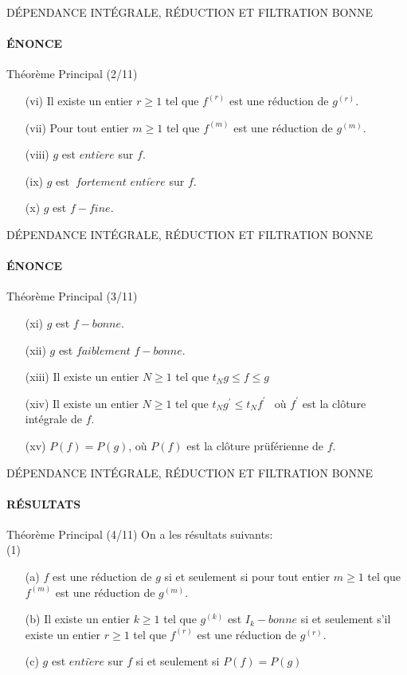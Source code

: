 \documentclass[11pt,a4paper]{beamer}
\begin{document}
\begin{frame}{DÉPENDANCE INTÉGRALE, RÉDUCTION ET FILTRATION BONNE}
	\framesubtitle{ÉNONCE}
	\begin{block}{Théorème Principal (2/11)}
		\begin{enumerate}
	\item[(vi)] Il existe un entier $r\geq 1$ tel que $f^{(r)}$ est une réduction de $g^{(r)}.$
			\item[(vii)] Pour tout entier $m\geq 1$ tel que $f^{(m)}$ est une réduction de $g^{(m)}.$
			\item[(viii)] $g$ est $enti\grave{e}re$ sur $f.$
			\item[(ix)] $g$ est $\ fortement$ $enti\grave{e}re$ sur $f.$
			\item[(x)] $g$ est $f-fine.$
		\end{enumerate}
	\end{block}
\end{frame}

\begin{frame}{DÉPENDANCE INTÉGRALE, RÉDUCTION ET FILTRATION BONNE}
	\framesubtitle{ÉNONCE}
	\begin{block}{Théorème Principal (3/11)}
		\begin{enumerate}
			\item[(xi)] $g$ est $f-bonne.$
			\item[(xii)] $g$ est $faiblement$ $f-bonne.$
			\item[(xiii)] Il existe un entier $N\geq 1$ tel que $t_{N}g\leq f\leq g$
			\item[(xiv)] Il existe un entier $N\geq 1$ tel que $t_{N}g^{\prime }\leq
			t_{N}f^{\prime \text{ }}$ où $f^{\prime }$ est la clôture intégrale de $f.$
			\item[(xv)] $P(f)=P(g)$, où $P(f)$ est la clôture prüférienne de $f.$
		\end{enumerate}
	\end{block}
\end{frame}

\begin{frame}{DÉPENDANCE INTÉGRALE, RÉDUCTION ET FILTRATION BONNE}
	\framesubtitle{RÉSULTATS}
	\begin{block}{Théorème Principal (4/11)}
		On a les résultats suivants:\\
		(1)
		\begin{enumerate}
			\item[(a)] $f$ est une réduction de $g$ si et seulement si pour tout entier $m\geq 1$ tel que $f^{(m)}$ est une réduction de $g^{(m)}.$ 
			\item[(b)] Il existe un entier $k\geq 1$ tel que $g^{(k)}$ est $I_{k}-bonne$ si et seulement s'il existe un entier $r\geq 1$ tel que $f^{(r)}$ est une réduction de $g^{(r)}.$
			\item[(c)] $g$ est $enti\grave{e}re$ sur $f$ si et seulement si $P(f)=P(g)$
		\end{enumerate}
	\end{block}
\end{frame}
\end{document}
